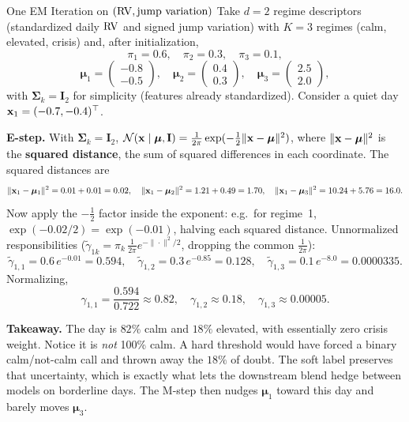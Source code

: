 \begin{workedexample}{One EM Iteration on $(\operatorname{RV}, \text{jump variation})$}
Take $d=2$ regime descriptors (standardized daily $\operatorname{RV}$ and signed jump
variation) with $K=3$ regimes (calm, elevated, crisis) and, after
initialization,
\[
  \pi_1 = 0.6,\quad \pi_2 = 0.3,\quad \pi_3 = 0.1,
\]
\[
  \bm{\mu}_1 = \begin{pmatrix} -0.8 \\ -0.5 \end{pmatrix}\!,\quad
  \bm{\mu}_2 = \begin{pmatrix} 0.4 \\ 0.3 \end{pmatrix}\!,\quad
  \bm{\mu}_3 = \begin{pmatrix} 2.5 \\ 2.0 \end{pmatrix}\!,
\]
with $\bm{\Sigma}_k = \mathbf{I}_2$ for simplicity (features already
standardized).  Consider a quiet day $\mathbf{x}_1 = (-0.7, -0.4)^\top$.

\textbf{E-step.}  With $\bm{\Sigma}_k=\mathbf{I}_2$,
$\mathcal{N}(\mathbf{x} \mid \bm{\mu}, \mathbf{I}) = \tfrac{1}{2\pi}\exp(-\tfrac12\|\mathbf{x}-\bm{\mu}\|^2)$,
where $\|\mathbf{x}-\bm{\mu}\|^2$ is the \textbf{squared distance}, the sum of
squared differences in each coordinate.  The squared distances are
\[
  \|\mathbf{x}_1 - \bm{\mu}_1\|^2 = 0.01 + 0.01 = 0.02,\quad
  \|\mathbf{x}_1 - \bm{\mu}_2\|^2 = 1.21 + 0.49 = 1.70,\quad
  \|\mathbf{x}_1 - \bm{\mu}_3\|^2 = 10.24 + 5.76 = 16.0.
\]
Now apply the $-\tfrac12$ factor inside the exponent: e.g.\ for regime~1,
$\exp(-0.02/2) = \exp(-0.01)$, halving each squared distance.  Unnormalized
responsibilities ($\tilde\gamma_{1k} = \pi_k\,\tfrac{1}{2\pi}e^{-\|\cdot\|^2/2}$,
dropping the common $\tfrac{1}{2\pi}$):
\[
  \tilde\gamma_{1,1} = 0.6\,e^{-0.01} = 0.594,\quad
  \tilde\gamma_{1,2} = 0.3\,e^{-0.85} = 0.128,\quad
  \tilde\gamma_{1,3} = 0.1\,e^{-8.0} = 0.0000335.
\]
Normalizing,
\[
  \gamma_{1,1} = \frac{0.594}{0.722} \approx 0.82,\quad
  \gamma_{1,2} \approx 0.18,\quad
  \gamma_{1,3} \approx 0.00005.
\]

\textbf{Takeaway.}  The day is $82\%$ calm and $18\%$ elevated, with
essentially zero crisis weight.  Notice it is \emph{not} 100\% calm.
A hard threshold would have forced a binary calm/not-calm call and thrown
away the $18\%$ of doubt.  The soft label preserves that uncertainty,
which is exactly what lets the downstream blend hedge between models on
borderline days.  The M-step then nudges $\bm{\mu}_1$ toward this day and
barely moves $\bm{\mu}_3$.
\end{workedexample}

